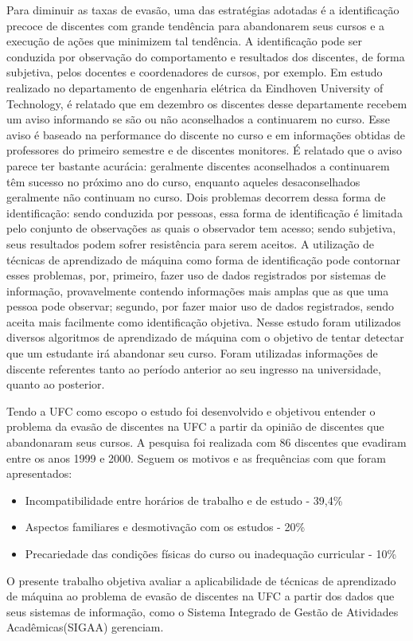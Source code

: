 Para diminuir as taxas de evasão, uma das estratégias adotadas é a identificação precoce de discentes com grande tendência para abandonarem seus cursos e a execução de ações que minimizem tal tendência. A identificação pode ser conduzida por observação do comportamento e resultados dos discentes, de forma subjetiva, pelos docentes e coordenadores de cursos, por exemplo. Em estudo realizado no departamento de engenharia elétrica da Eindhoven University of Technology\cite{Predicting_Students}, é relatado que em dezembro os discentes desse departamente recebem um aviso informando se são ou não aconselhados a continuarem no curso. Esse aviso é baseado na performance do discente no curso e em informações obtidas de professores do primeiro semestre e de discentes monitores. É relatado que o aviso parece ter bastante acurácia: geralmente discentes aconselhados a continuarem têm sucesso no próximo ano do curso, enquanto aqueles desaconselhados geralmente não continuam no curso.
Dois problemas decorrem dessa forma de identificação: sendo conduzida por pessoas, essa forma de identificação é limitada pelo conjunto de observações as quais o observador tem acesso; sendo subjetiva, seus resultados podem sofrer resistência para serem aceitos. A utilização de técnicas de aprendizado de máquina como forma de identificação pode contornar esses problemas, por, primeiro, fazer uso de dados registrados por sistemas de informação, provavelmente contendo informações mais amplas que as que uma pessoa pode observar; segundo, por fazer maior uso de dados registrados, sendo aceita mais facilmente como identificação objetiva. Nesse estudo foram utilizados diversos algoritmos de aprendizado de máquina com o objetivo de tentar detectar que um estudante irá abandonar seu curso. Foram utilizadas informações de discente referentes tanto ao período anterior ao seu ingresso na universidade, quanto ao posterior.

Tendo a UFC como escopo o estudo \cite{andriola_2003} foi desenvolvido e objetivou entender o problema da evasão de discentes na UFC a partir da opinião de discentes que abandonaram seus cursos. A pesquisa foi realizada com 86 discentes que evadiram entre os anos 1999 e 2000. Seguem os motivos e as frequências com que foram apresentados: 

\begin{itemize}
\item Incompatibilidade entre horários de trabalho e de estudo - 39,4\%
\item Aspectos familiares e desmotivação com os estudos - 20\%
\item Precariedade das condições físicas do curso ou inadequação curricular - 10\%
\end{itemize}


O presente trabalho objetiva avaliar a aplicabilidade de técnicas de aprendizado de máquina ao problema de evasão de discentes na UFC a partir dos dados que seus sistemas de informação, como o Sistema Integrado de Gestão de Atividades Acadêmicas(SIGAA) gerenciam.



